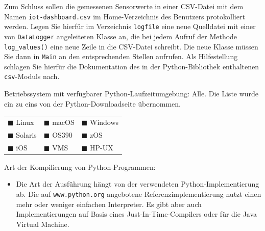 \bigskip
\teilaufgabe
Zum Schluss sollen die gemessenen Sensorwerte in einer CSV-Datei mit dem Namen
\texttt{iot\--dashboard.csv} im Home-Verzeichnis des Benutzers protokolliert
werden. Legen Sie hierfür im Verzeichnis \texttt{logfile} eine neue Quelldatei
mit einer von \texttt{Data\-Logger} angeleiteten Klasse an, die bei jedem
Aufruf der Methode \texttt{log\_\-values()} eine neue Zeile in die CSV-Datei
schreibt. Die neue Klasse müssen Sie dann in \texttt{Main} an den entsprechenden
Stellen aufrufen. Als Hilfestellung schlagen Sie hierfür die Dokumentation des
in der Python-Bibliothek enthaltenen \texttt{csv}-Moduls nach.


\clearpage
\LoesungHeader

\teilaufgabe
Betriebssystem mit verfügbarer Python-Laufzeitumgebung: Alle. Die Liste wurde
ein zu eins von der Python-Downloadseite übernommen.

\begin{center}
    \begin{tabular}{p{}p{}p{}}
        $\blacksquare$ Linux &
        $\blacksquare$ macOS &
        $\blacksquare$ Windows \\

        $\blacksquare$ Solaris &
        $\blacksquare$ OS390 &
        $\blacksquare$ zOS \\

        $\blacksquare$ iOS &
        $\blacksquare$ VMS &
        $\blacksquare$ HP-UX \\
    \end{tabular}
\end{center}

\bigskip
\teilaufgabe
Art der Kompilierung von Python-Programmen:

\begin{itemize}
    \renewcommand{\labelitemi}{$\blacksquare$}
    \item Die Art der Ausführung hängt von der verwendeten Python-Implementierung
    ab. Die auf \texttt{www.python.org} angebotene Referenzimplementierung nutzt
    einen mehr oder weniger einfachen Interpreter. Es gibt aber auch Implementierungen
    auf Basis eines Just-In-Time-Compilers oder für die Java Virtual Machine.
\end{itemize}

